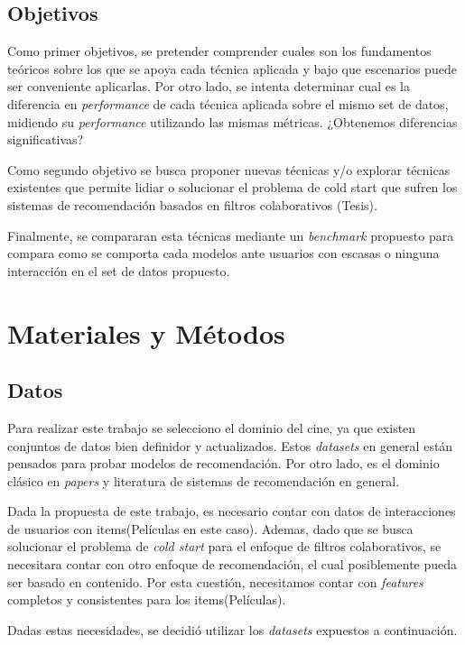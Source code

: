 \documentclass[11pt,a4paper,twoside]{thesis}
\begin{document}
\section{Objetivos}

Como primer objetivos, se pretender comprender cuales son los fundamentos teóricos sobre los que se apoya cada técnica aplicada y bajo que escenarios puede ser conveniente aplicarlas. Por otro lado, se intenta determinar cual es la diferencia en \textit{performance} de cada técnica aplicada sobre el mismo set de datos, midiendo su \textit{performance} utilizando las mismas métricas. ¿Obtenemos diferencias significativas?

Como segundo objetivo se busca proponer nuevas técnicas y/o explorar técnicas existentes que permite lidiar o solucionar el problema de cold start que sufren los sistemas de recomendación basados en filtros colaborativos (Tesis).

Finalmente, se compararan esta técnicas mediante un \textit{benchmark} propuesto para compara como se comporta cada modelos ante usuarios con escasas o ninguna interacción en el set de datos propuesto.

\chapter{Materiales y Métodos}

\section{Datos} 

Para realizar este trabajo se selecciono el dominio del cine, ya que existen conjuntos de datos bien definidor y actualizados. 
Estos \textit{datasets} en general están pensados para probar modelos de recomendación. Por otro lado, es el dominio clásico en \textit{papers} y literatura de sistemas de recomendación en general.

Dada la propuesta de este trabajo, es necesario contar con datos de interacciones de usuarios con items(Películas en este caso). Ademas, dado que se busca solucionar el problema de \textit{cold start} para el enfoque de filtros colaborativos, se necesitara contar con otro enfoque de recomendación, el cual posiblemente pueda ser basado en contenido. Por esta cuestión, necesitamos contar con \textit{features} completos y consistentes para los items(Películas).

Dadas estas necesidades, se decidió utilizar los \textit{datasets} expuestos a continuación.
\end{document}
